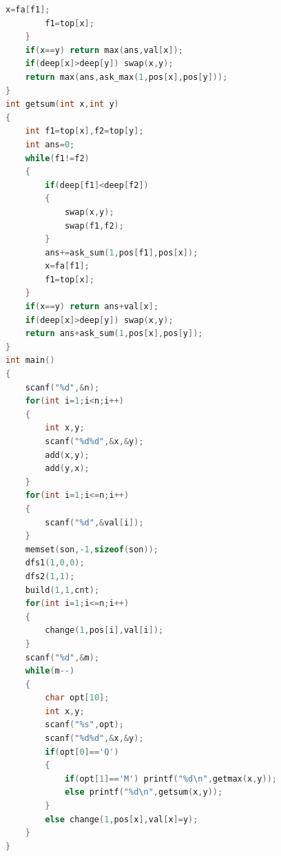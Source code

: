 \documentclass[UTF8,a4paper,titlepage]{ctexart}
\begin{document}
\begin{lstlisting}[language=C++]
        x=fa[f1];
        f1=top[x];
    }
    if(x==y) return max(ans,val[x]);
    if(deep[x]>deep[y]) swap(x,y);
    return max(ans,ask_max(1,pos[x],pos[y]));
}
int getsum(int x,int y)
{
    int f1=top[x],f2=top[y];
    int ans=0;
    while(f1!=f2)
    {
        if(deep[f1]<deep[f2])
        {
            swap(x,y);
            swap(f1,f2);
        }
        ans+=ask_sum(1,pos[f1],pos[x]);
        x=fa[f1];
        f1=top[x];
    }
    if(x==y) return ans+val[x];
    if(deep[x]>deep[y]) swap(x,y);
    return ans+ask_sum(1,pos[x],pos[y]);
}
int main()
{
    scanf("%d",&n);
    for(int i=1;i<n;i++)
    {
        int x,y;
        scanf("%d%d",&x,&y);
        add(x,y);
        add(y,x);
    }
    for(int i=1;i<=n;i++)
    {
        scanf("%d",&val[i]);
    }
    memset(son,-1,sizeof(son));
    dfs1(1,0,0);
    dfs2(1,1);
    build(1,1,cnt);
    for(int i=1;i<=n;i++)
    {
        change(1,pos[i],val[i]);
    }
    scanf("%d",&m);
    while(m--)
    {
        char opt[10];
        int x,y;
        scanf("%s",opt);
        scanf("%d%d",&x,&y);
        if(opt[0]=='Q')
        {
            if(opt[1]=='M') printf("%d\n",getmax(x,y));
            else printf("%d\n",getsum(x,y));
        }
        else change(1,pos[x],val[x]=y);
    }
}

    \end{lstlisting}
\end{document}
